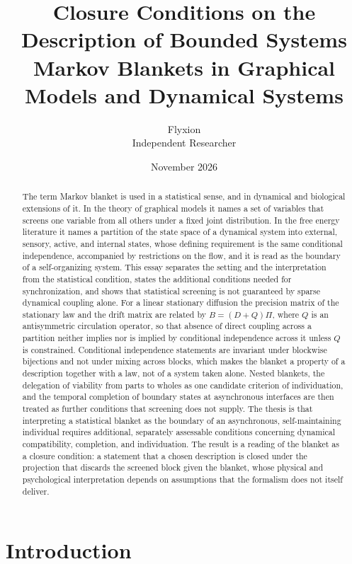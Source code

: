 \documentclass[11pt]{article}
\title{Closure Conditions on the Description of Bounded Systems\\[0.4em]\large Markov Blankets in Graphical Models and Dynamical Systems}
\author{Flyxion\\Independent Researcher}
\date{November 2026}
\theoremstyle{definition}
\begin{document}
\maketitle

\begin{abstract}
\noindent The term Markov blanket is used in a statistical sense, and in dynamical and biological extensions of it. In the theory of graphical models it names a set of variables that screens one variable from all others under a fixed joint distribution. In the free energy literature it names a partition of the state space of a dynamical system into external, sensory, active, and internal states, whose defining requirement is the same conditional independence, accompanied by restrictions on the flow, and it is read as the boundary of a self-organizing system. This essay separates the setting and the interpretation from the statistical condition, states the additional conditions needed for synchronization, and shows that statistical screening is not guaranteed by sparse dynamical coupling alone. For a linear stationary diffusion the precision matrix of the stationary law and the drift matrix are related by $B=(D+Q)\Pi$, where $Q$ is an antisymmetric circulation operator, so that absence of direct coupling across a partition neither implies nor is implied by conditional independence across it unless $Q$ is constrained. Conditional independence statements are invariant under blockwise bijections and not under mixing across blocks, which makes the blanket a property of a description together with a law, not of a system taken alone. Nested blankets, the delegation of viability from parts to wholes as one candidate criterion of individuation, and the temporal completion of boundary states at asynchronous interfaces are then treated as further conditions that screening does not supply. The thesis is that interpreting a statistical blanket as the boundary of an asynchronous, self-maintaining individual requires additional, separately assessable conditions concerning dynamical compatibility, completion, and individuation. The result is a reading of the blanket as a closure condition: a statement that a chosen description is closed under the projection that discards the screened block given the blanket, whose physical and psychological interpretation depends on assumptions that the formalism does not itself deliver.
\end{abstract}

\newpage
\section{Introduction}
\end{document}
